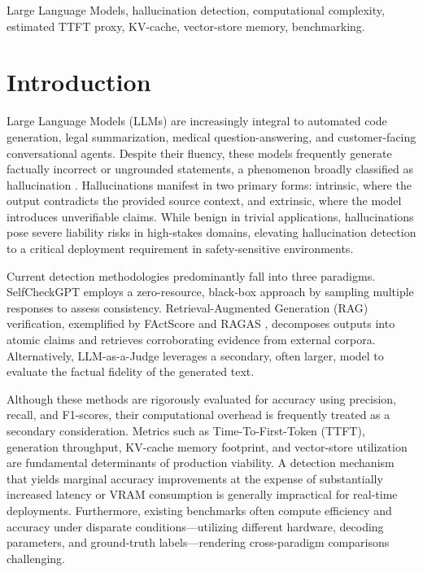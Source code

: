 \documentclass[conference]{IEEEtran}
\begin{document}
\begin{IEEEkeywords}
Large Language Models, hallucination detection, computational complexity, estimated TTFT proxy, KV-cache, vector-store memory, benchmarking.
\end{IEEEkeywords}

\section{Introduction}

Large Language Models (LLMs) are increasingly integral to automated code generation, legal summarization, medical question-answering, and customer-facing conversational agents. Despite their fluency, these models frequently generate factually incorrect or ungrounded statements, a phenomenon broadly classified as hallucination \cite{huang2023survey}. Hallucinations manifest in two primary forms: intrinsic, where the output contradicts the provided source context, and extrinsic, where the model introduces unverifiable claims. While benign in trivial applications, hallucinations pose severe liability risks in high-stakes domains, elevating hallucination detection to a critical deployment requirement in safety-sensitive environments.

Current detection methodologies predominantly fall into three paradigms. SelfCheckGPT \cite{manakul2023selfcheckgpt} employs a zero-resource, black-box approach by sampling multiple responses to assess consistency. Retrieval-Augmented Generation (RAG) verification, exemplified by FActScore \cite{min2023factscore} and RAGAS \cite{es2023ragas}, decomposes outputs into atomic claims and retrieves corroborating evidence from external corpora. Alternatively, LLM-as-a-Judge \cite{zheng2023judging} leverages a secondary, often larger, model to evaluate the factual fidelity of the generated text. 

Although these methods are rigorously evaluated for accuracy using precision, recall, and F1-scores, their computational overhead is frequently treated as a secondary consideration. Metrics such as Time-To-First-Token (TTFT), generation throughput, KV-cache memory footprint, and vector-store utilization are fundamental determinants of production viability. A detection mechanism that yields marginal accuracy improvements at the expense of substantially increased latency or VRAM consumption is generally impractical for real-time deployments. Furthermore, existing benchmarks often compute efficiency and accuracy under disparate conditions---utilizing different hardware, decoding parameters, and ground-truth labels---rendering cross-paradigm comparisons challenging.
\end{document}
